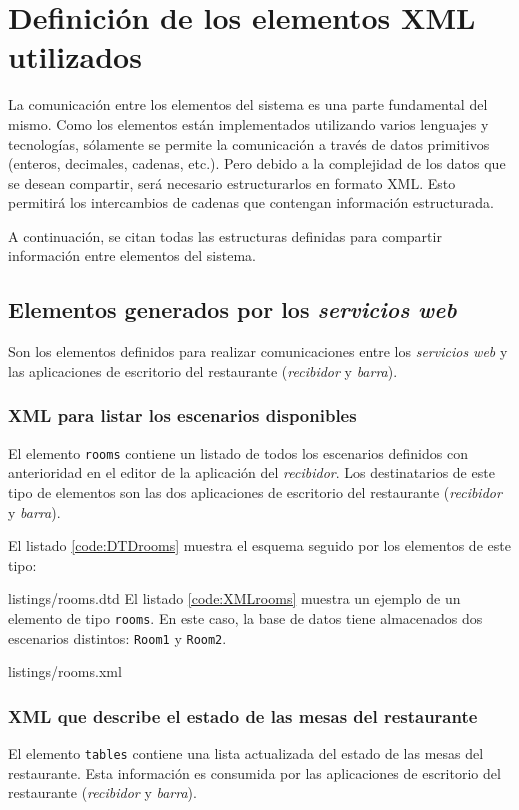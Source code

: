 \chapter{Definición de los elementos \acs{XML} utilizados}
\label{chap:xmls}
La comunicación entre los elementos del sistema es una parte fundamental del
mismo. Como los elementos están implementados utilizando varios lenguajes y
tecnologías, sólamente se permite la comunicación a través de datos primitivos
(enteros, decimales, cadenas, etc.). Pero debido a la complejidad de los datos
que se desean compartir, será necesario estructurarlos en formato \acs{XML}. 
Esto permitirá los intercambios de cadenas que contengan información
estructurada.

A continuación, se citan todas las estructuras definidas para compartir
información entre elementos del sistema.

\section{Elementos generados por los \emph{servicios web}}
Son los elementos definidos para realizar comunicaciones entre los
\emph{servicios web} y las aplicaciones de escritorio del restaurante
(\emph{recibidor} y \emph{barra}).
\subsection{\acs{XML} para listar los escenarios disponibles}
El elemento \texttt{rooms} contiene un listado de todos los escenarios 
definidos con anterioridad en el editor de la aplicación del \emph{recibidor}. 
Los destinatarios de este tipo de elementos son las dos aplicaciones de 
escritorio del restaurante (\emph{recibidor} y \emph{barra}).

El listado \ref{code:DTDrooms} muestra el esquema seguido por los elementos de
este tipo:

{listings/rooms.dtd}
El listado \ref{code:XMLrooms} muestra un ejemplo de un elemento de tipo
\texttt{rooms}. En este caso, la base de datos tiene almacenados dos
escenarios distintos: \texttt{Room1} y \texttt{Room2}.

{listings/rooms.xml}

\subsection{\acs{XML} que describe el estado de las mesas del restaurante}
El elemento \texttt{tables} contiene una lista actualizada del estado de las
mesas del restaurante. Esta información es consumida por las aplicaciones
de escritorio del restaurante (\emph{recibidor} y \emph{barra}).

